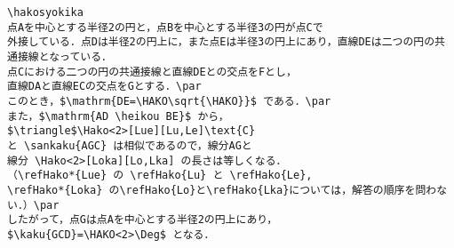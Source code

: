 \begin{verbatim}
\hakosyokika
点Aを中心とする半径2の円と，点Bを中心とする半径3の円が点Cで
外接している．点Dは半径2の円上に，また点Eは半径3の円上にあり，直線DEは二つの円の共通接線となっている．
点Cにおける二つの円の共通接線と直線DEとの交点をFとし，
直線DAと直線ECの交点をGとする．\par
このとき，$\mathrm{DE=\HAKO\sqrt{\HAKO}}$ である．\par
また，$\mathrm{AD \heikou BE}$ から，
$\triangle$\Hako<2>[Lue][Lu,Le]\text{C}
と \sankaku{AGC} は相似であるので，線分AGと
線分 \Hako<2>[Loka][Lo,Lka] の長さは等しくなる．
（\refHako*{Lue} の \refHako{Lu} と \refHako{Le}, 
\refHako*{Loka} の\refHako{Lo}と\refHako{Lka}については，解答の順序を問わない．）\par
したがって，点Gは点Aを中心とする半径2の円上にあり，
$\kaku{GCD}=\HAKO<2>\Deg$ となる．
\end{verbatim}
